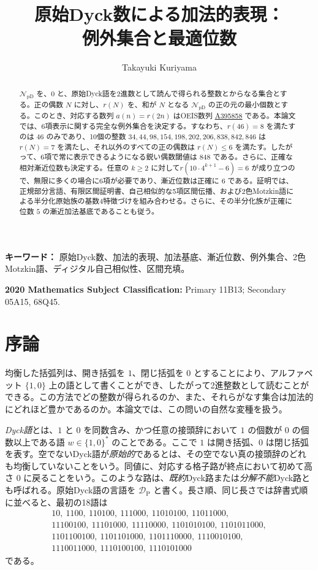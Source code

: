 \documentclass[12pt]{ltjsarticle}
\title{原始Dyck数による加法的表現：\\例外集合と最適位数}
\author{Takayuki Kuriyama}
\date{}
\theoremstyle{plain}
\theoremstyle{definition}
\theoremstyle{plain}
\newcommand{\NpD}{\mathcal{N}_{\mathrm{pD}}}
\newcommand{\DP}{\mathcal{D}_{\mathrm{P}}}
\newcommand{\seqnum}[1]{\href{https://oeis.org/#1}{\textrm{\underline{#1}}}}
\begin{document}
\maketitle

\begin{abstract}
$\NpD$ を、$0$ と、原始Dyck語を2進数として読んで得られる整数とからなる集合とする。正の偶数 $N$ に対し、$r(N)$ を、和が $N$ となる $\NpD$ の正の元の最小個数とする。このとき、対応する数列 $a(n)=r(2n)$ はOEIS数列 \seqnum{A395858} である。本論文では、6項表示に関する完全な例外集合を決定する。すなわち、$r(46)=8$ を満たすのは $46$ のみであり、10個の整数
$34,44,98,154,198,202,206,838,842,846$ は $r(N)=7$ を満たし、それ以外のすべての正の偶数は $r(N)\leq6$ を満たす。したがって、6項で常に表示できるようになる鋭い偶数閾値は $848$ である。さらに、正確な相対漸近位数も決定する。任意の $k\geq2$ に対して$  r(10\cdot4^{k+1}-6)=6$
が成り立つので、無限に多くの場合に6項が必要であり、漸近位数は正確に $6$ である。証明では、正規部分言語、有限区間証明書、自己相似的な5項区間伝播、および2色Motzkin語による半分化原始族の基数4特徴づけを組み合わせる。さらに、その半分化族が正確に位数 $5$ の漸近加法基底であることも従う。
\end{abstract}

\noindent\textbf{キーワード：} 原始Dyck数、加法的表現、加法基底、漸近位数、例外集合、2色Motzkin語、ディジタル自己相似性、区間充填。

\noindent\textbf{2020 Mathematics Subject Classification:} Primary 11B13;
Secondary 05A15, 68Q45.

\section{序論}\label{sec:introduction}

均衡した括弧列は、開き括弧を $1$、閉じ括弧を $0$ とすることにより、アルファベット $\{1,0\}$ 上の語として書くことができ、したがって2進整数として読むことができる。この方法でどの整数が得られるのか、また、それらがなす集合は加法的にどれほど豊かであるのか。本論文では、この問いの自然な変種を扱う。

\emph{Dyck語}とは、$1$ と $0$ を同数含み、かつ任意の接頭辞において $1$ の個数が $0$ の個数以上である語 $w\in\{1,0\}^*$ のことである。ここで $1$ は開き括弧、$0$ は閉じ括弧を表す。空でないDyck語が\emph{原始的}であるとは、その空でない真の接頭辞のどれも均衡していないことをいう。同値に、対応する格子路が終点において初めて高さ $0$ に戻ることをいう。このような路は、\emph{既約}Dyck路または\emph{分解不能}Dyck路とも呼ばれる。原始Dyck語の言語を $\DP$ と書く。長さ順、同じ長さでは辞書式順に並べると、最初の18語は
\[
\begin{gathered}
10,\ 1100,\ 110100,\ 111000,\ 11010100,\ 11011000,\\
11100100,\ 11101000,\ 11110000,\ 1101010100,\ 1101011000,\\
1101100100,\ 1101101000,\ 1101110000,\ 1110010100,\\
1110011000,\ 1110100100,\ 1110101000
\end{gathered}
\]
である。
\end{document}
